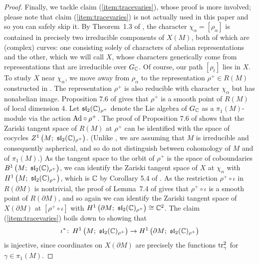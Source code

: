 \documentclass[tikz, sepfignums, defaultenums]{nmd/article}
\newcommand{\GC}{G_\C}
\newcommand{\slrhoplus}{\mathfrak{sl}_2(\C)_{\rho^+}}
\newcommand{\inc}{\iota}
\newcommand{\twisted}[3]{#1^#2\left(#3; \  \slrhoplus\right)}
\begin{document}
\begin{proof}
Finally, we tackle claim (\ref{item:tracevaries}), whose proof is more
involved; please note that claim (\ref{item:tracevaries}) is not
actually used in this paper and so you can safely skip it.  By
Theorem~1.3 of \cite{HeusenerPorti2005}, the character
$\chi_\alpha = [\rho_\alpha]$ is contained in precisely two
irreducible components of $X(M)$, both of which are (complex) curves:
one consisting solely of characters of abelian representations and the
other, which we will call $X$, whose characters generically come from
representations that are irreducible over $\GC$.  Of course, our path
$[\rho_t]$ lies in $X$.  To study $X$ near $\chi_\alpha$, we move away
from $\rho_\alpha$ to the representation $\rho^+ \in R(M)$ constructed
in \cite[\S 5]{HeusenerPorti2005}.  The representation $\rho^+$ is
also reducible with character $\chi_\alpha$ but has nonabelian image.
Proposition 7.6 of \cite{HeusenerPorti2005} gives that $\rho^+$ is a
smooth point of $R(M)$ of local dimension 4.  Let $\slrhoplus$ denote
the Lie algebra of $\GC$ as a $\pi_1(M)$-module via the action
$\mathrm{Ad} \circ \rho^+$.  The proof of Proposition 7.6 of
\cite{HeusenerPorti2005} shows that the Zariski tangent space of
$R(M)$ at $\rho^+$ can be identified with the space of cocycles
$\twisted{Z}{1}{M}$. (Unlike \cite{HeusenerPorti2005}, we are assuming
that $M$ is irreducible and consequently aspherical, and so do not
distinguish between cohomology of $M$ and of $\pi_1(M)$.)  As the
tangent space to the orbit of $\rho^+$ is the space of coboundaries
$\twisted{B}{1}{M}$, we can identify the Zariski tangent space of $X$
at $\chi_\alpha$ with $\twisted{H}{1}{M}$, which is ${\mathbb C}$ by Corollary
5.4 of \cite{HeusenerPorti2005}.  As the restriction
$\rho^+ \circ \inc$ in $R(\partial M)$ is nontrivial, the proof of
Lemma~7.4 of \cite{HeusenerPorti2005} gives that $\rho^+ \circ \inc$
is a smooth point of $R(\partial M)$, and so again we can identify
the Zariski tangent space of $X(\partial M)$ at $[\rho^+ \circ \inc]$
with $\twisted{H}{1}{\partial M} \cong \C^2$.  The claim
(\ref{item:tracevaries}) boils down to showing that
\begin{equation}\label{eq:cohomap}
\inc^* \maps  \twisted{H}{1}{M} \to \twisted{H}{1}{\partial M} 
\end{equation}
is injective, since coordinates on $X(\partial M)$ are precisely the
functions $\operatorname{tr}^2_\gamma$ for $\gamma \in \pi_1(M)$.


\end{proof}
\end{document}
